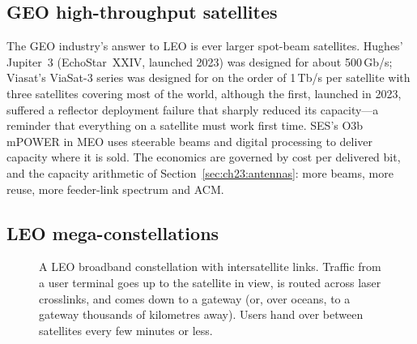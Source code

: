 \subsection{GEO high-throughput satellites}

The GEO industry's answer to LEO is ever larger spot-beam satellites. Hughes' Jupiter~3
(EchoStar~XXIV, launched 2023) was designed for about 500\,Gb/s; Viasat's ViaSat-3 series was
designed for on the order of 1\,Tb/s per satellite with three satellites covering most of the
world, although the first, launched in 2023, suffered a reflector deployment failure that sharply
reduced its capacity---a reminder that everything on a satellite must work first time. SES's
O3b mPOWER in MEO uses steerable beams and digital processing to deliver capacity where it is
sold. The economics are governed by cost per delivered bit, and the capacity arithmetic of
Section~\ref{sec:ch23:antennas}: more beams, more reuse, more feeder-link spectrum and ACM.

\subsection{LEO mega-constellations}

\begin{figure}[htbp]\centering
{}
\caption{A LEO broadband constellation with intersatellite links. Traffic from a user terminal goes
up to the satellite in view, is routed across laser crosslinks, and comes down to a gateway (or,
over oceans, to a gateway thousands of kilometres away). Users hand over between satellites every
few minutes or less.}
\label{fig:ch23_leo_arch}
\end{figure}

